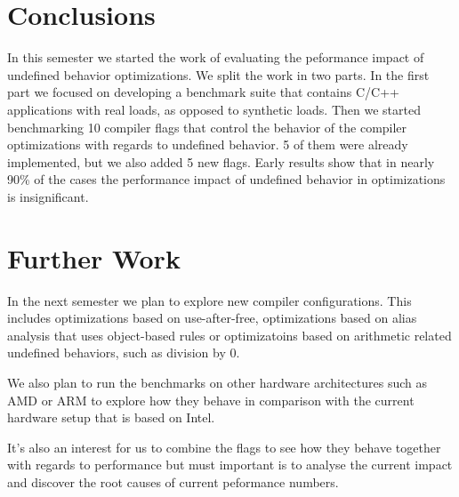 \section{Conclusions} \label{sec:ccl}

In this semester we started the work of evaluating the peformance impact of
undefined behavior optimizations. We split the work in two parts. In the first
part we focused on developing a benchmark suite that contains C/C++ applications
with real loads, as opposed to synthetic loads. Then we started benchmarking 10
compiler flags that control the behavior of the compiler optimizations with
regards to undefined behavior. 5 of them were already implemented, but we also
added 5 new flags. Early results show that in nearly 90\% of the cases the
performance impact of undefined behavior in optimizations is insignificant.

\section{Further Work} \label{sec:further-work}

In the next semester we plan to explore new compiler configurations. This
includes optimizations based on use-after-free, optimizations based on alias
analysis that uses object-based rules or optimizatoins based on arithmetic
related undefined behaviors, such as division by 0.

We also plan to run the benchmarks on other hardware architectures such as AMD
or ARM to explore how they behave in comparison with the current hardware setup
that is based on Intel.

It's also an interest for us to combine the flags to see how they behave
together with regards to performance but must important is to analyse the
current impact and discover the root causes of current peformance numbers.
